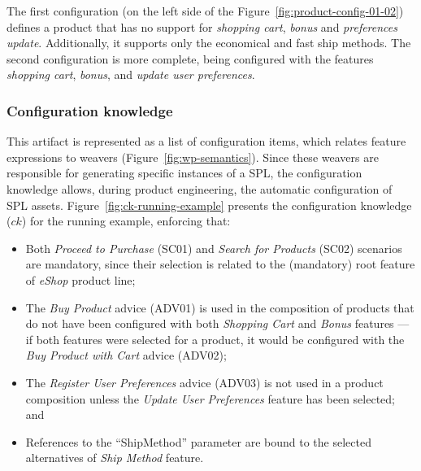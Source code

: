 The first configuration (on the left side of the
Figure~\ref{fig:product-config-01-02}) defines a product that has no support for
\emph{shopping cart}, \emph{bonus} and \emph{preferences update}. Additionally,
it supports only the economical and fast ship methods. The second configuration
is more complete, being configured with the features \emph{shopping cart},
\emph{bonus}, and \emph{update user preferences}.

\subsubsection{Configuration knowledge}

This artifact is represented as a list of configuration items, which relates
feature expressions to weavers (Figure~\ref{fig:wp-semantics}). Since these
weavers are responsible for generating specific instances of a SPL,
the configuration knowledge allows, during product engineering, the automatic
configuration of SPL assets. Figure~\ref{fig:ck-running-example} presents the
configuration knowledge ($ck$) for the running example, enforcing that:

\begin{itemize}
\item Both \emph{Proceed to Purchase} (SC01) and \emph{Search for Products}
(SC02) scenarios are mandatory, since their selection is related to the
(mandatory) root feature of \emph{eShop} product line;

\item The \emph{Buy Product} advice (ADV01) is used in the composition of
products that do not have been configured with both \emph{Shopping Cart} and \emph{Bonus}
features --- if both features were selected for a product, it would be configured
with the \emph{Buy Product with Cart} advice (ADV02);

\item The \emph{Register User Preferences} advice (ADV03) is not used in a
product composition unless the \emph{Update User Preferences} feature has been
selected; and

\item References to the ``ShipMethod'' parameter are bound to the
selected alternatives of \emph{Ship Method} feature.

\end{itemize}

